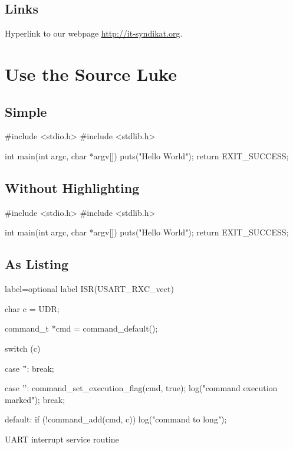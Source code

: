 \documentclass{itsarticle}
\begin{document}
\subsection{Links}
\label{sub:links}

Hyperlink to our webpage \url{http://it-syndikat.org}.

\newpage

\section{Use the Source Luke}
\label{sec:use_the_source_luke}

\subsection{Simple}
\label{sub:simple}

\begin{ccode}
#include <stdio.h>
#include <stdlib.h>

int main(int argc, char *argv[]) {
    puts("Hello World");
    return EXIT_SUCCESS;
}
\end{ccode}

\subsection{Without Highlighting}
\label{sub:without_highlighting}

\begin{code}
#include <stdio.h>
#include <stdlib.h>

int main(int argc, char *argv[]) {
    puts("Hello World");
    return EXIT_SUCCESS;
}
\end{code}


\subsection{As Listing}
\label{sub:as_listing}

\begin{listing}[h!]
    \begin{ccode*}{label={optional label}}
ISR(USART_RXC_vect) {
    char c = UDR;

    command_t *cmd = command_default();

    switch (c) {
        case '\r':
            break;

        case '\n':
            command_set_execution_flag(cmd, true);
            log("command execution marked");
            break;

        default:
            if (!command_add(cmd, c)) {
                log("command to long");
            }
    }
}
    \end{ccode*}
    \caption{UART interrupt service routine}
    \label{lst:uart_isr}
\end{listing}
\end{document}
